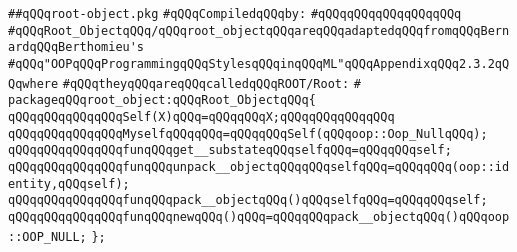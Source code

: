 \label{src/lib/src/root-object.pkg}
\verb|##qQQqroot-object.pkg|\newline
\newline
\verb|#qQQqCompiledqQQqby:|\newline
\verb|#qQQqqQQqqQQqqQQqqQQq|\newline
\newline
\verb|#qQQqRoot_ObjectqQQq/qQQqroot_objectqQQqareqQQqadaptedqQQqfromqQQqBernardqQQqBerthomieu's|\newline
\verb|#qQQq"OOPqQQqProgrammingqQQqStylesqQQqinqQQqML"qQQqAppendixqQQq2.3.2qQQqwhere|\newline
\verb|#qQQqtheyqQQqareqQQqcalledqQQqROOT/Root:|\newline
\verb|#|\newline
\newline
\verb|packageqQQqroot_object:qQQqRoot_ObjectqQQq{|\newline
\newline
\verb|qQQqqQQqqQQqqQQqSelf(X)qQQq=qQQqqQQqX;qQQqqQQqqQQqqQQq|\newline
\verb|qQQqqQQqqQQqqQQqMyselfqQQqqQQq=qQQqqQQqSelf(qQQqoop::Oop_NullqQQq);|\newline
\newline
\verb|qQQqqQQqqQQqqQQqfunqQQqget__substateqQQqselfqQQq=qQQqqQQqself;|\newline
\verb|qQQqqQQqqQQqqQQqfunqQQqunpack__objectqQQqqQQqselfqQQq=qQQqqQQq(oop::identity,qQQqself);|\newline
\verb|qQQqqQQqqQQqqQQqfunqQQqpack__objectqQQq()qQQqselfqQQq=qQQqqQQqself;|\newline
\newline
\verb|qQQqqQQqqQQqqQQqfunqQQqnewqQQq()qQQq=qQQqqQQqpack__objectqQQq()qQQqoop::OOP_NULL;|\newline
\verb|};|\newline
\newline

